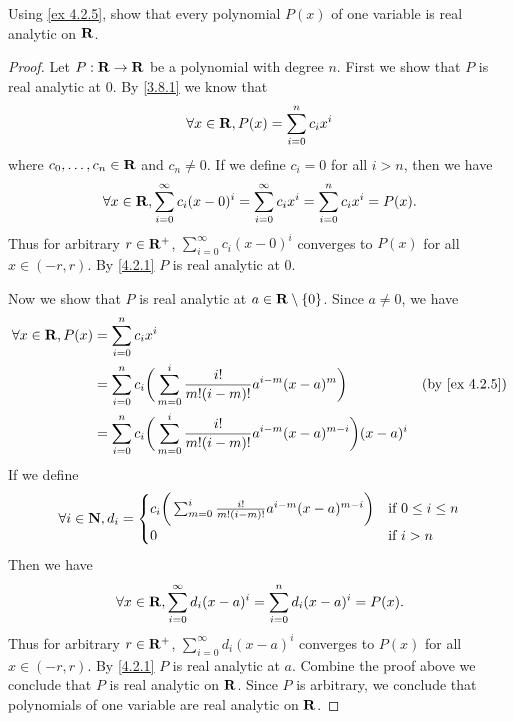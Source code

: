 \begin{exercise}\label{ex 4.2.6}
  Using \cref{ex 4.2.5}, show that every polynomial \(P(x)\) of one variable is real analytic on \(\mathbf{R}\).
\end{exercise}

\begin{proof}
  Let \(P : \mathbf{R} \to \mathbf{R}\) be a polynomial with degree \(n\).
  First we show that \(P\) is real analytic at \(0\).
  By \cref{3.8.1} we know that
  \[
    \forall x \in \mathbf{R}, P(x) = \sum_{i = 0}^n c_i x^i
  \]
  where \(c_0, \dots, c_n \in \mathbf{R}\) and \(c_n \neq 0\).
  If we define \(c_i = 0\) for all \(i > n\), then we have
  \[
    \forall x \in \mathbf{R}, \sum_{i = 0}^\infty c_i (x - 0)^i = \sum_{i = 0}^\infty c_i x^i = \sum_{i = 0}^n c_i x^i = P(x).
  \]
  Thus for arbitrary \(r \in \mathbf{R}^+\), \(\sum_{i = 0}^\infty c_i (x - 0)^i\) converges to \(P(x)\) for all \(x \in (-r, r)\).
  By \cref{4.2.1} \(P\) is real analytic at \(0\).

  Now we show that \(P\) is real analytic at \(a \in \mathbf{R} \setminus \{0\}\).
  Since \(a \neq 0\), we have
  \begin{align*}
    \forall x \in \R, P(x) & = \sum_{i = 0}^n c_i x^i                                                                                                                 \\
                           & = \sum_{i = 0}^n c_i \bigg(\sum_{m = 0}^i \frac{i!}{m! (i - m)!} a^{i - m} (x - a)^m\bigg)                 & \text{(by \cref{ex 4.2.5})} \\
                           & = \sum_{i = 0}^n c_i \bigg(\sum_{m = 0}^i \frac{i!}{m! (i - m)!} a^{i - m} (x - a)^{m - i}\bigg) (x - a)^i
  \end{align*}
  If we define
  \[
    \forall i \in \mathbf{N}, d_i = \begin{cases}
      c_i \bigg(\sum_{m = 0}^i \frac{i!}{m! (i - m)!} a^{i - m} (x - a)^{m - i}\bigg) & \text{if } 0 \leq i \leq n \\
      0                                                                               & \text{if } i > n
    \end{cases}
  \]
  Then we have
  \[
    \forall x \in \mathbf{R}, \sum_{i = 0}^\infty d_i (x - a)^i = \sum_{i = 0}^n d_i (x - a)^i = P(x).
  \]
  Thus for arbitrary \(r \in \mathbf{R}^+\), \(\sum_{i = 0}^\infty d_i (x - a)^i\) converges to \(P(x)\) for all \(x \in (-r, r)\).
  By \cref{4.2.1} \(P\) is real analytic at \(a\).
  Combine the proof above we conclude that \(P\) is real analytic on \(\mathbf{R}\).
  Since \(P\) is arbitrary, we conclude that polynomials of one variable are real analytic on \(\mathbf{R}\).
\end{proof}

